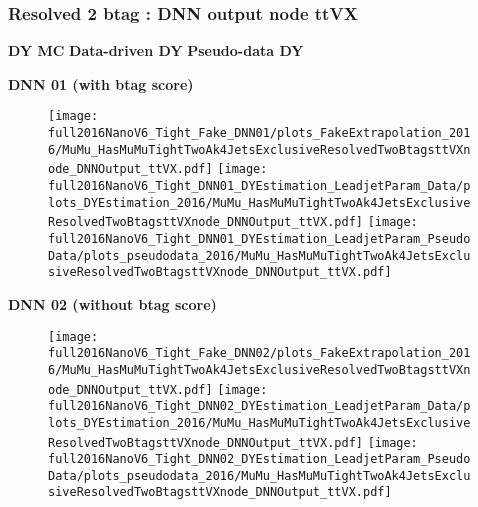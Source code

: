 \documentclass[9pt]{beamer}
\begin{document}
\begin{frame}
	\frametitle{Resolved 2 btag : DNN output node ttVX}
    \hspace{2cm} \textbf{DY MC} \hspace{1.9cm} \textbf{Data-driven DY} \hspace{1cm} \textbf{Pseudo-data DY}
    \begin{center}
        \textbf{DNN 01 (with btag score)}
    \end{center}
	\begin{figure}
		\texttt{[image: full2016NanoV6\_Tight\_Fake\_DNN01/plots\_FakeExtrapolation\_2016/MuMu\_HasMuMuTightTwoAk4JetsExclusiveResolvedTwoBtagsttVXnode\_DNNOutput\_ttVX.pdf]}
		\texttt{[image: full2016NanoV6\_Tight\_DNN01\_DYEstimation\_LeadjetParam\_Data/plots\_DYEstimation\_2016/MuMu\_HasMuMuTightTwoAk4JetsExclusiveResolvedTwoBtagsttVXnode\_DNNOutput\_ttVX.pdf]}
		\texttt{[image: full2016NanoV6\_Tight\_DNN01\_DYEstimation\_LeadjetParam\_PseudoData/plots\_pseudodata\_2016/MuMu\_HasMuMuTightTwoAk4JetsExclusiveResolvedTwoBtagsttVXnode\_DNNOutput\_ttVX.pdf]}
	\end{figure}
    \begin{center}
        \textbf{DNN 02 (without btag score)}
    \end{center}
	\begin{figure}
		\texttt{[image: full2016NanoV6\_Tight\_Fake\_DNN02/plots\_FakeExtrapolation\_2016/MuMu\_HasMuMuTightTwoAk4JetsExclusiveResolvedTwoBtagsttVXnode\_DNNOutput\_ttVX.pdf]}
		\texttt{[image: full2016NanoV6\_Tight\_DNN02\_DYEstimation\_LeadjetParam\_Data/plots\_DYEstimation\_2016/MuMu\_HasMuMuTightTwoAk4JetsExclusiveResolvedTwoBtagsttVXnode\_DNNOutput\_ttVX.pdf]}
		\texttt{[image: full2016NanoV6\_Tight\_DNN02\_DYEstimation\_LeadjetParam\_PseudoData/plots\_pseudodata\_2016/MuMu\_HasMuMuTightTwoAk4JetsExclusiveResolvedTwoBtagsttVXnode\_DNNOutput\_ttVX.pdf]}
	\end{figure}
\end{frame}
\end{document}
